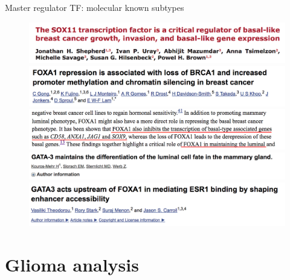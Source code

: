 \documentclass[slidestop,compress,11pt,xcolor=dvipsnames]{beamer}
\begin{document}
\begin{frame}{Master regulator TF: molecular known subtypes}

 \begin{figure}[ht!]
  \centering
  \includegraphics[width=1.0\textwidth]{ELMER/SOX11_basal.png}
  \includegraphics[width=1.0\textwidth]{ELMER/SOX9_2.png}
  \includegraphics[width=1.0\textwidth]{ELMER/SOX9_1.png}
  \includegraphics[width=1.0\textwidth]{ELMER/GATA3.png}
  \includegraphics[width=1.0\textwidth]{ELMER/cofactors.png}
     \end{figure}
\end{frame}

\section{Glioma analysis}
\end{document}
